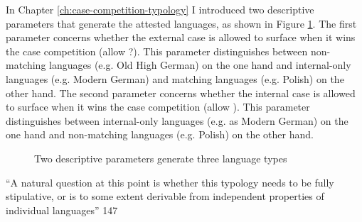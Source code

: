 In Chapter \ref{ch:case-competition-typology} I introduced two descriptive parameters that generate the attested languages, as shown in Figure \ref{fig:two-parameters}.
The first parameter concerns whether the external case is allowed to surface when it wins the case competition (allow ?). This parameter distinguishes between non-matching languages (e.g. Old High German) on the one hand and internal-only languages (e.g. Modern German) and matching languages (e.g. Polish) on the other hand.
The second parameter concerns whether the internal case is allowed to surface when it wins the case competition (allow ). This parameter distinguishes between internal-only languages (e.g. as Modern German) on the one hand and non-matching languages (e.g. Polish) on the other hand.

\begin{figure}[H]
  \centering
    \footnotesize{
    }
    \caption{Two descriptive parameters generate three language types}
    \label{fig:two-parameters}
\end{figure}

``A natural question at this point is whether this typology needs to be fully stipulative, or is to some extent derivable from independent properties of individual languages'' \citet{grosu1994}{147}

